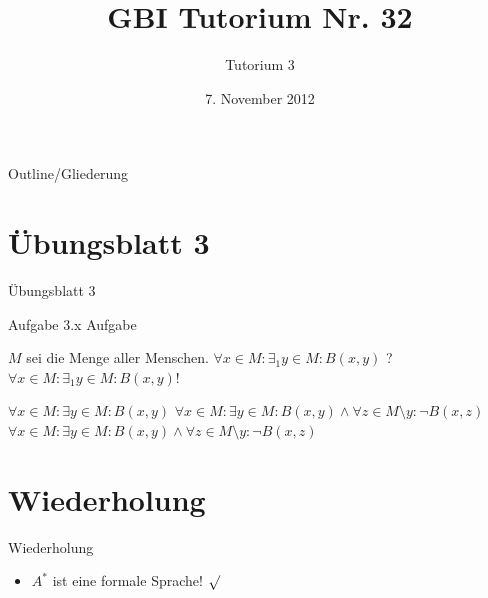 

\title[Tutorium 3]{GBI Tutorium Nr. 32}
\subtitle{Tutorium 3}
\date{7. November 2012}






	\begin{frame}
		\titlepage
	\end{frame}

	\begin{frame}{Outline/Gliederung}
		\tableofcontents
	\end{frame}
	
	
	\section{Übungsblatt 3}
	\begin{frame} {Übungsblatt 3}
		\begin{block} {Aufgabe 3.x}
			Aufgabe
		\end{block}
		\begin{overprint}
			$M$ sei die Menge aller Menschen.
			\onslide<2> $\forall x \in M: \exists_1 y\in M:B(x,y)$ ?
			\onslide<3-> \color{red} $\forall x \in M: \exists_1 y\in M:B(x,y)$!\\
			
		\end{overprint}
		\begin{overprint}
			 $\forall x \in M: \exists y \in M: B(x,y)$
			\onslide<5> $\forall x \in M: \exists y \in M: B(x,y)\land \forall z \in  M \! \setminus \! y: \lnot B(x,z)$
			\onslide<6> \color{darkgreen}$\forall x \in M: \exists y \in M: B(x,y)\land \forall z \in  M \! \setminus \! y: \lnot B(x,z)$
		\end{overprint}
	
	\end{frame}	
		
	
	\section{Wiederholung} 
	\begin{frame} {Wiederholung}
		\begin{itemize}
			\item $A^*$ ist eine formale Sprache! 
			\only<2-> {\color{darkgreen}$\surd$}\\
			\color{black}
		\end{itemize}
	\end{frame}
	
